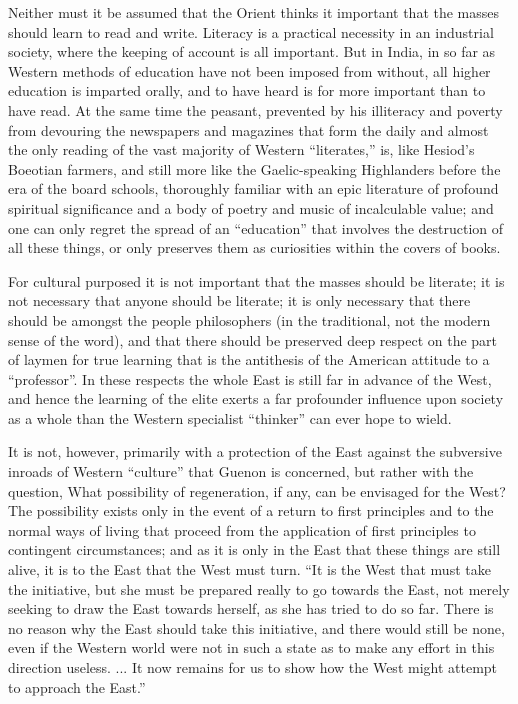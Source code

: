 Neither must it be assumed that the Orient thinks it important that the masses should learn to read and write. Literacy is a practical necessity in an industrial society, where the keeping of account is all important. But in India, in so far as Western methods of education have not been imposed from without, all higher education is imparted orally, and to have heard is for more important than to have read. At the same time the peasant, prevented by his illiteracy and poverty from devouring the newspapers and magazines that form the daily and almost the only reading of the vast majority of Western ``literates,'' is, like Hesiod's Boeotian farmers, and still more like the Gaelic-speaking Highlanders before the era of the board schools, thoroughly familiar with an epic literature of profound spiritual significance and a body of poetry and music of incalculable value; and one can only regret the spread of an ``education'' that involves the destruction of all these things, or only preserves them as curiosities within the covers of books.

For cultural purposed it is not important that the masses should be literate; it is not necessary that anyone should be literate; it is only necessary that there should be amongst the people philosophers (in the traditional, not the modern sense of the word), and that there should be preserved deep respect on the part of laymen for true learning that is the antithesis of the American attitude to a ``professor''. In these respects the whole East is still far in advance of the West, and hence the learning of the elite exerts a far profounder influence upon society as a whole than the Western specialist ``thinker'' can ever hope to wield.

It is not, however, primarily with a protection of the East against the subversive inroads of Western ``culture'' that Guenon is concerned, but rather with the question, What possibility of regeneration, if any, can be envisaged for the West? The possibility exists only in the event of a return to first principles and to the normal ways of living that proceed from the application of first principles to contingent circumstances; and as it is only in the East that these things are still alive, it is to the East that the West must turn. ``It is the West that must take the initiative, but she must be prepared really to go towards the East, not merely seeking to draw the East towards herself, as she has tried to do so far. There is no reason why the East should take this initiative, and there would still be none, even if the Western world were not in such a state as to make any effort in this direction useless. ... It now remains for us to show how the West might attempt to approach the East.''

